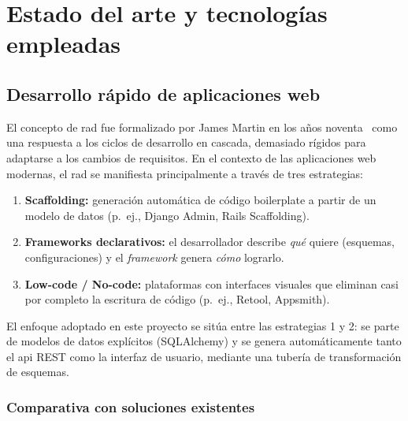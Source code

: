 \chapter{Estado del arte y tecnologías empleadas}
\label{ch:arte}

\section{Desarrollo rápido de aplicaciones web}
\label{sec:rad}

El concepto de \gls{rad} fue formalizado por James Martin en los años noventa~\cite{martin1991rad} como
una respuesta a los ciclos de desarrollo en cascada, demasiado rígidos para adaptarse a los
cambios de requisitos. En el contexto de las aplicaciones web modernas, el \gls{rad} se
manifiesta principalmente a través de tres estrategias:

\begin{enumerate}
  \item \textbf{Scaffolding:} generación automática de código boilerplate a partir de un
    modelo de datos (p.~ej., Django Admin, Rails Scaffolding).
  \item \textbf{Frameworks declarativos:} el desarrollador describe \textit{qué} quiere
    (esquemas, configuraciones) y el \textit{framework} genera \textit{cómo} lograrlo.
  \item \textbf{Low-code / No-code:} plataformas con interfaces visuales que eliminan
    casi por completo la escritura de código (p.~ej., Retool, Appsmith).
\end{enumerate}

El enfoque adoptado en este proyecto se sitúa entre las estrategias 1 y 2: se parte de
modelos de datos explícitos (SQLAlchemy) y se genera automáticamente tanto el
\gls{api} REST como la interfaz de usuario, mediante una tubería de transformación de
esquemas.

\subsection{Comparativa con soluciones existentes}
\label{subsec:comparativa}

